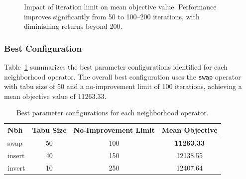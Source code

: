 \begin{figure}[ht]
    \centering
    \caption{Impact of iteration limit on mean objective value. Performance improves significantly from 50 to 100--200 iterations, with diminishing returns beyond 200.}
    \label{fig:iterations_impact}
\end{figure}

\subsubsection{Best Configuration}

Table~\ref{tab:best_configs} summarizes the best parameter configurations identified for each neighborhood operator. The overall best configuration uses the \texttt{swap} operator with tabu size of 50 and a no-improvement limit of 100 iterations, achieving a mean objective value of 11263.33.

\begin{table}[ht]
    \renewcommand{\arraystretch}{1.3}
    \caption{Best parameter configurations for each neighborhood operator.}
    \label{tab:best_configs}
    \centering
    \begin{tabular}{l|c|c|c}
        \hline\hline
        Nbh & Tabu Size & No-Improvement Limit & Mean Objective \\
        \hline\hline
        swap   & 50 & 100 & \textbf{11263.33} \\ \hline
        insert & 40 & 150 & 12138.55 \\ \hline
        invert & 10 & 250 & 12407.64 \\
        \hline\hline
    \end{tabular}
\end{table}

